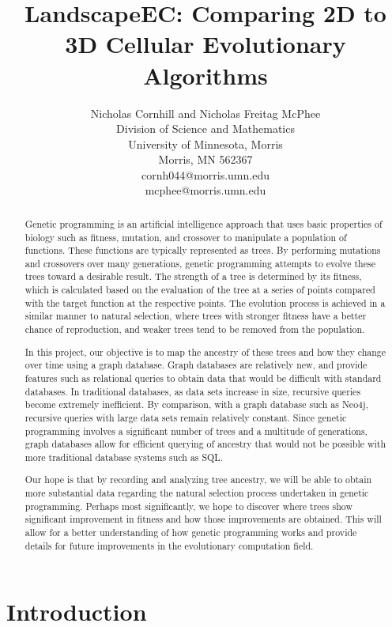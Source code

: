 \documentclass[12pt]{article}
\title{LandscapeEC: Comparing 2D to 3D Cellular Evolutionary Algorithms}
\author{
 		Nicholas Cornhill and Nicholas Freitag McPhee\\
        Division of Science and Mathematics\\
        University of Minnesota, Morris\\
        Morris, MN 562367\\
        cornh044@morris.umn.edu\\
        mcphee@morris.umn.edu\\
}
\date{}
\begin{document}
\pagestyle{plain}

\maketitle

\begin{abstract}

Genetic programming is an artificial intelligence approach that uses basic properties of biology such as fitness, mutation, and crossover to manipulate a population of functions. These functions are typically represented as trees. By performing mutations and crossovers over many generations, genetic programming attempts to evolve these trees toward a desirable result. The strength of a tree is determined by its fitness, which is calculated based on the evaluation of the tree at a series of points compared with the target function at the respective points. The evolution process is achieved in a similar manner to natural selection, where trees with stronger fitness have a better chance of reproduction, and weaker trees tend to be removed from the population.

In this project, our objective is to map the ancestry of these trees and how they change over time using a graph database. Graph databases are relatively new, and provide features such as relational queries to obtain data that would be difficult with standard databases. In traditional databases, as data sets increase in size, recursive queries become extremely inefficient. By comparison, with a graph database such as Neo4j, recursive queries with large data sets remain relatively constant. Since genetic programming involves a significant number of trees and a multitude of generations, graph databases allow for efficient querying of ancestry that would not be possible with more traditional database systems such as SQL.  

Our hope is that by recording and analyzing tree ancestry, we will be able to obtain more substantial data regarding the natural selection process undertaken in genetic programming. Perhaps most significantly, we hope to discover where trees show significant improvement in fitness and how those improvements are obtained. This will allow for a better understanding of how genetic programming works and provide details for future improvements in the evolutionary computation field.

\end{abstract}

\section{Introduction} \label{sec:intro}
\end{document}
